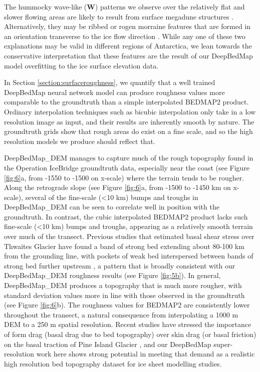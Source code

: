 \documentclass[tc, manuscript]{copernicus}
\begin{document}
The hummocky wave-like (\textbf{W}) patterns we observe over the relatively flat and slower flowing areas are likely to result from surface megadune structures \citep{ScambosSnowMegadune2014}.
Alternatively, they may be ribbed or rogen morraine features that are formed in an orientation transverse to the ice flow direction  \citep{HattestrandRibbedmorainesSweden1997,HattestrandRibbedmoraineformation1999}.
While any one of these two explanations may be valid in different regions of Antarctica, we lean towards the conservative interpretation that these features are the result of our DeepBedMap model overfitting to the ice surface elevation data.

In Section \ref{section:surfaceroughness}, we quantify that a well trained DeepBedMap neural network model can produce roughness values more comparable to the groundtruth than a simple interpolated BEDMAP2 product.
Ordinary interpolation techniques such as bicubic interpolation only take in a low resolution image as input, and their results are inherently smooth by nature.
The groundtruth grids show that rough areas do exist on a fine scale, and so the high resolution models we produce should reflect that.

DeepBedMap\_DEM manages to capture much of the rough topography found in the Operation IceBridge groundtruth data, especially near the coast (see Figure \ref{fig:6}a, from -1550 to -1500 on x-scale) where the terrain tends to be rougher.
Along the retrograde slope (see Figure \ref{fig:6}a, from -1500 to -1450 km on x-scale), several of the fine-scale (<10 km) bumps and troughs in DeepBedMap\_DEM can be seen to correlate well in position with the groundtruth.
In contrast, the cubic interpolated BEDMAP2 product lacks such fine-scale (<10 km) bumps and troughs, appearing as a relatively smooth terrain over much of the transect.
Previous studies that estimated basal shear stress over Thwaites Glacier have found a band of strong bed extending about 80-100 km from the grounding line, with pockets of weak bed interspersed between bands of strong bed further upstream \citep{JoughinBasalconditionsPine2009,SergienkoRegularPatternsFrictional2013}, a pattern that is broadly consistent with our DeepBedMap\_DEM roughness results (see Figure \ref{fig:5b}).
In general, DeepBedMap\_DEM produces a topography that is much more rougher, with standard deviation values more in line with those observed in the groundtruth (see Figure \ref{fig:6}b).
The roughness values for BEDMAP2 are consistently lower throughout the transect, a natural consequence from interpolating a 1000 m DEM to a 250 m spatial resolution.
Recent studies have stressed the importance of form drag (basal drag due to bed topography) over skin drag (or basal friction) on the basal traction of Pine Island Glacier \citep{BinghamDiverselandscapesPine2017,Kyrke-SmithRelevanceDetailBasal2018}, and our DeepBedMap super-resolution work here shows strong potential in meeting that demand as a realistic high resolution bed topography dataset for ice sheet modelling studies.
\end{document}
